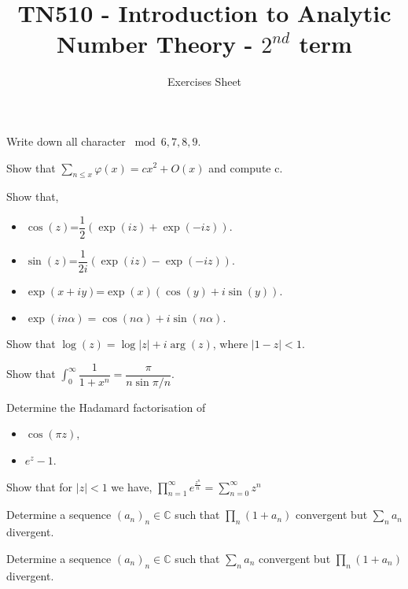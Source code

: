 \documentclass[12pt]{article}
\newcommand{\C}{\mathbb{C}}
\newenvironment{exercise}[2][Exercise]{\begin{trivlist}
\item[\hskip \labelsep {\bfseries #1}\hskip \labelsep {\bfseries #2.}]}{\end{trivlist}}
\begin{document}
\title{TN510 - Introduction to Analytic Number Theory - $2^{nd}$ term}
\author{Exercises Sheet}
\date{}
\maketitle
\thispagestyle{empty}
\begin{exercise}{1}
Write down all character $\bmod 6,7,8,9$.
\end{exercise}
\begin{exercise}{2}
Show that $\displaystyle\sum_{n\leq x}\varphi(x)=cx^2+O(x)$ and compute c.
\end{exercise}
\begin{exercise}{3}
Show that,
\begin{itemize}
\item $\cos(z)$=$\dfrac{1}{2}\left(\exp(iz)+\exp(-iz)\right)$.
\item $\sin(z)$=$\dfrac{1}{2i}\left(\exp(iz)-\exp(-iz)\right)$.
\item $\exp(x+iy)$=$\exp(x)(\cos(y)+i\sin(y))$.
\item $\exp(in\alpha)=\cos(n\alpha)+i\sin(n\alpha)$.
\end{itemize}
\end{exercise}
\begin{exercise}{4} Show that $\log(z)=\log|z|+i \operatorname{arg}(z)$, where $\vert 1-z\vert<1$.
\end{exercise}
\begin{exercise}{5}
Show that $\displaystyle\int_{0}^{\infty}\dfrac{1}{1+x^n}=\dfrac{\pi}{n\sin\pi/n}.$
\end{exercise}
\begin{exercise}{6}
Determine the Hadamard factorisation of 
\begin{itemize}
\item $\cos(\pi z)$,
\item $e^z-1$.
\end{itemize}
\end{exercise}
\begin{exercise}{7}
Show that for $\vert z \vert<1$ we have, $\displaystyle\prod _{n=1}^{\infty }e^{{\frac {z^n}{n}}}=\sum_{n=0}^{\infty}z^{n}$
\end{exercise}
\begin{exercise}{8}
Determine a sequence $(a_n)_n\in \C$ such that $\prod_{n}\left(1+a_n\right)$ convergent but $\sum_{n}a_n$ divergent.
\end{exercise}
\begin{exercise}{9}
Determine a sequence $(a_n)_n\in\C$ such that $\sum_{n}a_n$ convergent but $\prod_{n}\left(1+a_n\right)$ divergent.
\end{exercise}
\end{document}
